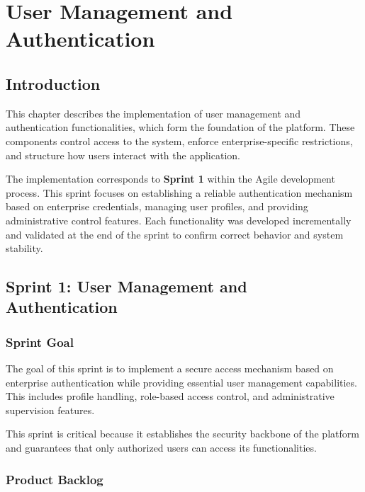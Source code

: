 \chapter{User Management and Authentication} 

\section{Introduction}

This chapter describes the implementation of user management and authentication functionalities, which form the foundation of the platform. These components control access to the system, enforce enterprise-specific restrictions, and structure how users interact with the application.

The implementation corresponds to \textbf{Sprint 1} within the Agile development process. This sprint focuses on establishing a reliable authentication mechanism based on enterprise credentials, managing user profiles, and providing administrative control features. Each functionality was developed incrementally and validated at the end of the sprint to confirm correct behavior and system stability.

\section{Sprint 1: User Management and Authentication}

\subsection{Sprint Goal}

The goal of this sprint is to implement a secure access mechanism based on enterprise authentication while providing essential user management capabilities. This includes profile handling, role-based access control, and administrative supervision features.

This sprint is critical because it establishes the security backbone of the platform and guarantees that only authorized users can access its functionalities.

\subsection{Product Backlog}

